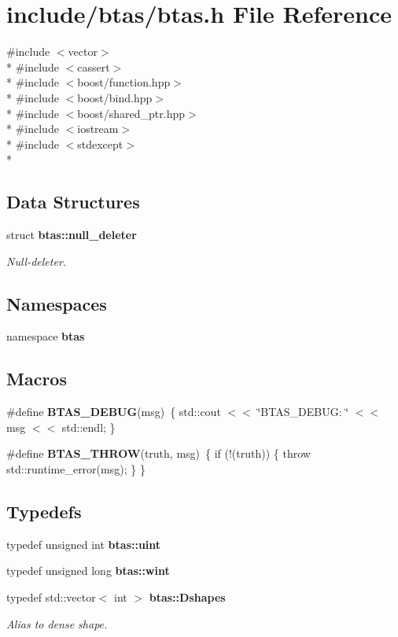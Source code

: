 \section{include/btas/btas.h File Reference}
\label{d9/d0b/btas_8h}
{\ttfamily \#include $<$vector$>$}\\*
{\ttfamily \#include $<$cassert$>$}\\*
{\ttfamily \#include $<$boost/function.\-hpp$>$}\\*
{\ttfamily \#include $<$boost/bind.\-hpp$>$}\\*
{\ttfamily \#include $<$boost/shared\-\_\-ptr.\-hpp$>$}\\*
{\ttfamily \#include $<$iostream$>$}\\*
{\ttfamily \#include $<$stdexcept$>$}\\*
\subsection*{Data Structures}
\begin{DoxyCompactItemize}
\item 
struct {\bf btas\-::null\-\_\-deleter}
\begin{DoxyCompactList}\small\item\em Null-\/deleter. \end{DoxyCompactList}\end{DoxyCompactItemize}
\subsection*{Namespaces}
\begin{DoxyCompactItemize}
\item 
namespace {\bf btas}
\end{DoxyCompactItemize}
\subsection*{Macros}
\begin{DoxyCompactItemize}
\item 
\#define {\bf B\-T\-A\-S\-\_\-\-D\-E\-B\-U\-G}(msg)~\{ std\-::cout $<$$<$ \char`\"{}B\-T\-A\-S\-\_\-\-D\-E\-B\-U\-G\-: \char`\"{} $<$$<$ msg $<$$<$ std\-::endl; \}
\item 
\#define {\bf B\-T\-A\-S\-\_\-\-T\-H\-R\-O\-W}(truth, msg)~\{ if (!(truth)) \{ throw std\-::runtime\-\_\-error(msg); \} \}
\end{DoxyCompactItemize}
\subsection*{Typedefs}
\begin{DoxyCompactItemize}
\item 
typedef unsigned int {\bf btas\-::uint}
\item 
typedef unsigned long {\bf btas\-::wint}
\item 
typedef std\-::vector$<$ int $>$ {\bf btas\-::\-Dshapes}
\begin{DoxyCompactList}\small\item\em Alias to dense shape. \end{DoxyCompactList}\end{DoxyCompactItemize}


